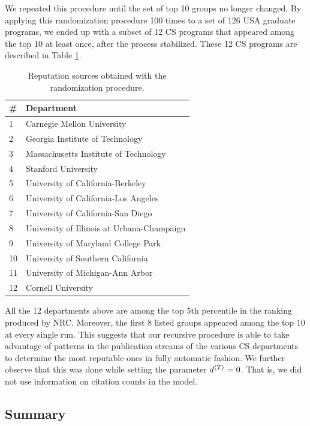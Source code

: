 \documentclass[notitlepage]{svjour3}
\begin{document}
We repeated this procedure until the set of top 10 groups no longer changed.
By applying this randomization procedure 100 times to a set of 126 USA graduate programs, 
we ended up with a subset of 12 CS programs that appeared 
among the top 10 at least once, after the process stabilized. These 12 CS programs are
described in Table \ref{tab:departments}.

\begin{table}[ht!]
 \centering
 \begin{tabular}{l l} 
 \toprule
 \# & Department \\ 
 \midrule
 1  & Carnegie Mellon University \\
 2  & Georgia Institute of Technology \\
 3  & Massachusetts Institute of Technology \\
 4  & Stanford University \\
 5  & University of California-Berkeley \\
 6  & University of California-Los Angeles \\
 7  & University of California-San Diego \\
 8  & University of Illinois at Urbana-Champaign \\
 9  & University of Maryland College Park \\
 10 & University of Southern California \\
 11 & University of Michigan-Ann Arbor \\
 12 & Cornell University \\
 \bottomrule
 \end{tabular}
 \caption{Reputation sources obtained with the randomization procedure.}
 \label{tab:departments}
\end{table}

All the 12 departments above are among the top 5th percentile in the ranking produced by NRC. 
Moreover, the first 8 listed groups appeared among the top 10 at every single run.
This suggests that our recursive procedure is able to take advantage of patterns in the publication 
streams of the various CS departments to determine the most reputable ones in fully automatic fashion.
We further observe that this was done while setting the parameter $d{^{\langle T \rangle}} = 0$. That is, we did 
not use information on citation counts in the model. 

\subsection{Summary} 
\end{document}
